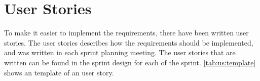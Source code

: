 \section{User Stories}
To make it easier to implement the requirements, there have been written user stories. The user stories describes how the requirements should be implemented, and was written in each sprint planning meeting. The user stories that are written can be found in the sprint design for each of the sprint. \autoref{tab:us:template} shows an template of an user story.

\begin{table}[htbp] \footnotesize \center
\caption{User Story Template\label{tab:us:template}}
\noindent{}
\end{table}


